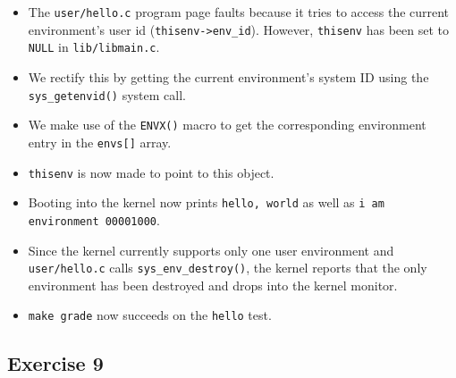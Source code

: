 \documentclass[]{article}
\begin{document}
\begin{itemize}
\itemsep1pt\parskip0pt
\item
  The \texttt{user/hello.c} program page faults because it tries to
  access the current environment's user id
  (\texttt{thisenv-\textgreater{}env\_id}). However, \texttt{thisenv}
  has been set to \texttt{NULL} in \texttt{lib/libmain.c}.
\item
  We rectify this by getting the current environment's system ID using
  the \texttt{sys\_getenvid()} system call.
\item
  We make use of the \texttt{ENVX()} macro to get the corresponding
  environment entry in the \texttt{envs{[}{]}} array.
\item
  \texttt{thisenv} is now made to point to this object.
\item
  Booting into the kernel now prints \texttt{hello, world} as well as
  \texttt{i am environment 00001000}.
\item
  Since the kernel currently supports only one user environment and
  \texttt{user/hello.c} calls \texttt{sys\_env\_destroy()}, the kernel
  reports that the only environment has been destroyed and drops into
  the kernel monitor.
\item
  \texttt{make grade} now succeeds on the \texttt{hello} test.
\end{itemize}

\subsection{Exercise 9}
\end{document}
